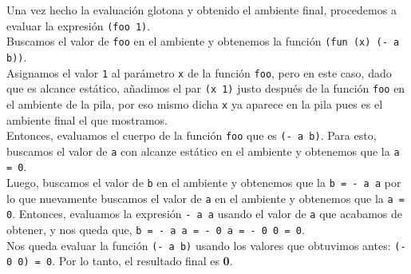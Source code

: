 \documentclass[11pt]{article}
\begin{document}
\begin{enumerate}[leftmargin=0.8cm]
\begin{itemize}
\begin{center}
        \end{center}

        Una vez hecho la evaluación glotona y obtenido el ambiente final, procedemos a evaluar la expresión \texttt{(foo 1)}.\\
        Buscamos el valor de \texttt{foo} en el ambiente y obtenemos la función \texttt{(fun (x) (- a b))}.\\
        Asignamos el valor \texttt{1} al parámetro \texttt{x} de la función \texttt{foo}, pero en este caso, dado que es alcance estático, añadimos el par \texttt{(x 1)} justo después de la función \texttt{foo} en el ambiente de la pila, por eso mismo dicha \texttt{x} ya aparece en la pila pues es el ambiente final el que mostramos.\\
        Entonces, evaluamos el cuerpo de la función \texttt{foo} que es \texttt{(- a b)}. Para esto, buscamos el valor de \texttt{a} con alcanze estático en el ambiente y obtenemos que la \texttt{a = 0}.\\
        Luego, buscamos el valor de \texttt{b} en el ambiente y obtenemos que la \texttt{b = - a a} por lo que nuevamente buscamos el valor de \texttt{a} en el ambiente y obtenemos que la \texttt{a = 0}. Entonces, evaluamos la expresión \texttt{- a a} usando el valor de \texttt{a} que acabamos de obtener, y nos queda que, \texttt{b = - a a = - 0 a = - 0 0 = 0}.\\
        Nos queda evaluar la función \texttt{(- a b)} usando los valores que obtuvimos antes: \texttt{(- 0 0) = 0}. Por lo tanto, el resultado final es \textbf{0}.\\


\end{itemize}
\end{enumerate}
\end{document}
